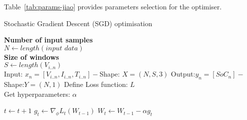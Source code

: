 %
%
Table~\ref{tab:params-jiao} provides parameters selection for the optimiser.
\begin{algorithm}
  \caption{Stochastic Gradient Descent (SGD) optimisation}
  \begin{algorithmic}[1]
    \STATE \textbf{Number of input samples} \\ $N\gets length(\textit{input data})$\\
    \STATE \textbf{Size of windows} \\ $S\gets length(V_{i..n})$\\
    \STATE Input: $x_n = [V_{i..n}, I_{i..n}, T_{i..n}] - $Shape: $X = (N, S, 3)$
    \STATE Output:$y_n = [SoC_{n}] - $Shape:$Y = (N, 1)$
    \STATE Define Loss function: $L$ \\
           Get hyperparameters: $\alpha$
    
    \STATE $t \gets t+1$
    \STATE $g_t \gets \nabla_\phi L_t (W_{t-1})$ 
    \STATE $W_t \gets W_{t-1} - \alpha g_t $ 
    \ENDWHILE
  \end{algorithmic}
  \label{alg:SGD}
\end{algorithm}

